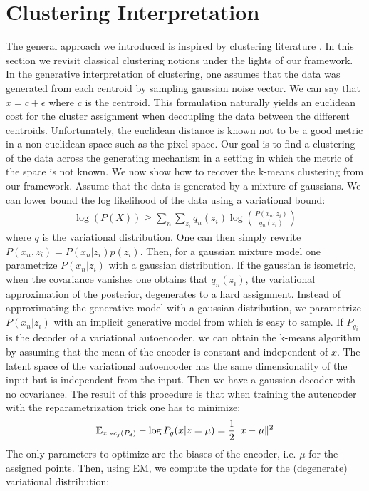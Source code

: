 \documentclass{article}
\newcommand{\Pd}{P_{d}}
\begin{document}
\section{Clustering Interpretation}
The general approach we introduced is inspired by clustering literature \cite{aggarwal2013data}. In this section we revisit classical clustering notions under the lights of our framework.  In the generative interpretation of clustering, one assumes that the data was generated from each centroid by sampling gaussian noise vector. We can say that $x = c + \epsilon$ where $c$ is the centroid. This formulation naturally yields an euclidean cost for the cluster assignment when decoupling the data between the different centroids. Unfortunately, the euclidean distance is known not to be a good metric in a non-euclidean space such as the pixel space. Our goal is to find a clustering of the data across the generating mechanism in a setting in which the metric of the space is not known. We now show how to recover the k-means clustering from our framework.
Assume that the data is generated by a mixture of gaussians. We can lower bound the log likelihood of the data using a variational bound:
\begin{align*}
\log(P(X)) \geq \sum_n \sum_{z_i} q_n(z_i) \log\left( \frac{P(x_n,z_i)}{q_n(z_i)}\right)
\end{align*}
 where $q$ is the variational distribution. One can then simply rewrite $P(x_n,z_i) = P(x_n|z_i)p(z_i)$. Then, for a gaussian mixture model one parametrize $P(x_n|z_i)$ with a gaussian distribution. If the gaussian is isometric, when the covariance vanishes one obtains that $q_n(z_i)$, the variational approximation of the posterior, degenerates to a hard assignment. Instead of approximating the generative model with a gaussian distribution, we parametrize $P(x_n|z_i)$ with an implicit generative model from which is easy to sample. If $P_{g_i}$ is the decoder of a variational autoencoder, we can obtain the k-means algorithm by assuming that the mean of the encoder is constant and independent of $x$. The latent space of the variational autoencoder has the same dimensionality of the input but is independent from the input. Then we have a gaussian decoder with no covariance. The result of this procedure is that when training the autencoder with the reparametrization trick one has to minimize:
 \begin{align*}
 \bbE_{x\sim c_j(\Pd)} - \log P_g(x|z = \mu) =  \frac{1}{2}\|x - \mu \|^2
 \end{align*}
 The only parameters to optimize are the biases of the encoder, i.e. $\mu$ for the assigned points. Then, using EM, we compute the update for the (degenerate) variational distribution:
\end{document}
